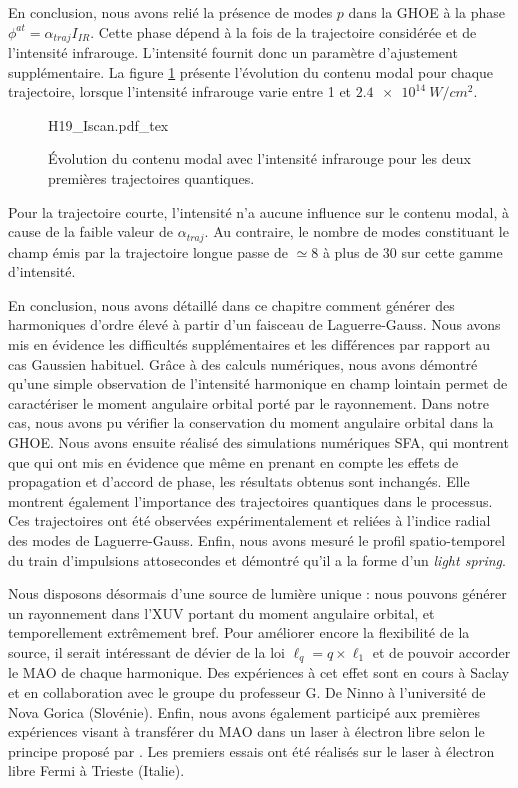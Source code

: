 En conclusion, nous avons relié la présence de modes $p$ dans la GHOE à la phase $\phi^{at}=\alpha_{traj} I_{IR}$. Cette phase dépend à la fois de la trajectoire considérée et de l'intensité infrarouge. L'intensité fournit donc un paramètre d'ajustement supplémentaire. La figure \ref{Fig:H19_Iscan} présente l'évolution du contenu modal pour chaque trajectoire, lorsque l'intensité infrarouge varie entre 1 et $\SI{2.4e14}{W/cm^2}$.

\begin{figure}[!ht]
\centering
\def\svgwidth{\columnwidth}
{H19_Iscan.pdf_tex}
\caption{\'Evolution du contenu modal avec l'intensité infrarouge pour les deux premières trajectoires quantiques.}
\label{Fig:H19_Iscan}
\end{figure}

Pour la trajectoire courte, l'intensité n'a aucune influence sur le contenu modal, à cause de la faible valeur de $\alpha_{traj}$. Au contraire, le nombre de modes constituant le champ émis par la trajectoire longue passe de $\simeq 8$ à plus de 30 sur cette gamme d'intensité. 

En conclusion, nous avons détaillé dans ce chapitre comment générer des harmoniques d'ordre élevé à partir d'un faisceau de Laguerre-Gauss. Nous avons mis en évidence les difficultés supplémentaires et les différences par rapport au cas Gaussien habituel. Grâce à des calculs numériques, nous avons démontré qu'une simple observation de l'intensité harmonique en champ lointain permet de caractériser le moment angulaire orbital porté par le rayonnement. Dans notre cas, nous avons pu vérifier la conservation du moment angulaire orbital dans la GHOE. Nous avons ensuite réalisé des simulations numériques SFA, qui montrent que qui ont mis en évidence que même en prenant en compte les effets de propagation et d'accord de phase, les résultats obtenus sont inchangés. Elle montrent également l'importance des trajectoires quantiques dans le processus. Ces trajectoires ont été observées expérimentalement et reliées à l'indice radial des modes de Laguerre-Gauss. Enfin, nous avons mesuré le profil spatio-temporel du train d'impulsions attosecondes et démontré qu'il a la forme d'un \textit{light spring}.

Nous disposons désormais d'une source de lumière unique : nous pouvons générer un rayonnement dans l'XUV portant du moment angulaire orbital, et temporellement extrêmement bref. Pour améliorer encore la flexibilité de la source, il serait intéressant de dévier de la loi $\ell_q=q\times\ell_1$ et de pouvoir accorder le MAO de chaque harmonique. Des expériences à cet effet sont en cours à Saclay et en collaboration avec le groupe du professeur G. De Ninno à l'université de Nova Gorica (Slovénie). Enfin, nous avons également participé aux premières expériences visant à transférer du MAO dans un laser à électron libre selon le principe proposé par . Les premiers essais ont été réalisés sur le laser à électron libre Fermi à Trieste (Italie). 

